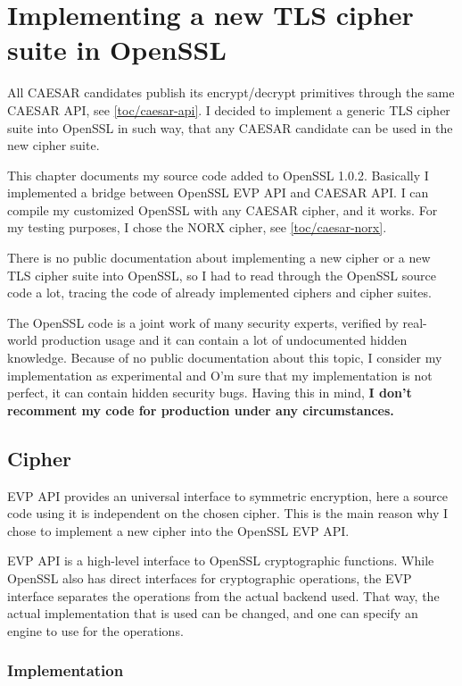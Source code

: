 \chapter{Implementing a new TLS cipher suite in OpenSSL}

All CAESAR candidates publish its encrypt/decrypt primitives through the same CAESAR API, see \autoref{toc/caesar-api}. I decided to implement a generic TLS cipher suite into OpenSSL in such way, that any CAESAR candidate can be used in the new cipher suite.

This chapter documents my source code added to OpenSSL 1.0.2. Basically I implemented a bridge between OpenSSL EVP API and CAESAR API. I can compile my customized OpenSSL with any CAESAR cipher, and it works. For my testing purposes, I chose the NORX cipher, see \autoref{toc/caesar-norx}.

There is no public documentation about implementing a new cipher or a new TLS cipher suite into OpenSSL, so I had to read through the OpenSSL source code a lot, tracing the code of already implemented ciphers and cipher suites.

The OpenSSL code is a joint work of many security experts, verified by real-world production usage and it can contain a lot of undocumented hidden knowledge. Because of no public documentation about this topic, I consider my implementation as experimental and O'm sure that my implementation is not perfect, it can contain hidden security bugs. Having this in mind, \textbf{I don't recomment my code for production under any circumstances.}

\section{Cipher}
\label{toc/implementation-cipher}

EVP API provides an universal interface to symmetric encryption, here a source code using it is independent on the chosen cipher. This is the main reason why I chose to implement a new cipher into the OpenSSL EVP API.

EVP API is a high-level interface to OpenSSL cryptographic functions. While OpenSSL also has direct interfaces for cryptographic operations, the EVP interface separates the operations from the actual backend used. That way, the actual implementation that is used can be changed, and one can specify an engine to use for the operations.

\subsection{Implementation}

